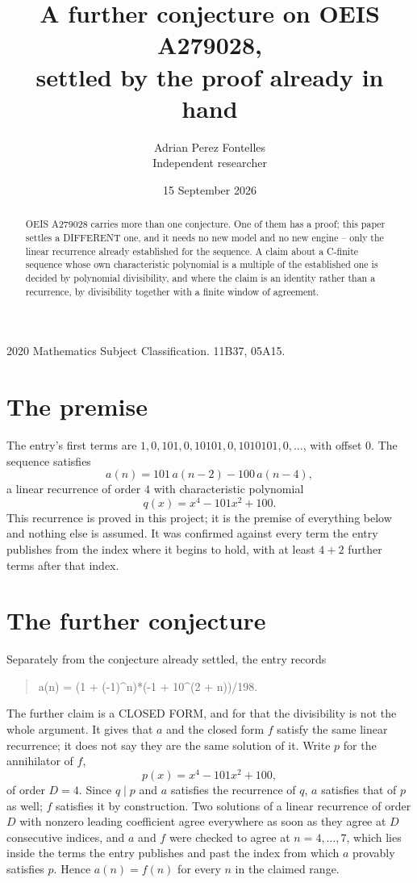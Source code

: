 \documentclass[11pt,a4paper]{article}
\title{A further conjecture on OEIS A279028,\\ \large settled by the proof already in hand}
\author{Adrian Perez Fontelles\\ \small Independent researcher}
\date{15 September 2026}
\theoremstyle{plain}
\theoremstyle{definition}
\begin{document}
\maketitle

\begin{abstract}
OEIS A279028 carries more than one conjecture. One of them has a proof; this paper settles a
DIFFERENT one, and it needs no new model and no new engine -- only the linear recurrence already
established for the sequence. A claim about a C-finite sequence whose own characteristic
polynomial is a multiple of the established one is decided by polynomial divisibility, and where
the claim is an identity rather than a recurrence, by divisibility together with a finite window
of agreement.
\end{abstract}

\noindent\small 2020 Mathematics Subject Classification. 11B37, 05A15.\normalsize

\section{The premise}

The entry's first terms are $1, 0, 101, 0, 10101, 0, 1010101, 0,\dots$, with offset $0$. The sequence satisfies
\[
  a(n)=101\,a(n-2) - 100\,a(n-4) ,
\]
a linear recurrence of order $4$ with characteristic polynomial
\[
  q(x)=x^{4} - 101 x^{2} + 100 .
\]
This recurrence is proved in this project; it is the premise of everything below and nothing else is assumed.
It was confirmed against every term the entry publishes from the index where it begins to hold,
with at least $4+2$ further terms after that index.

\section{The further conjecture}

Separately from the conjecture already settled, the entry records

\begin{quote}\raggedright a(n) = (1 + (-1)\^{}n)*(-1 + 10\^{}(2 + n))/198.\end{quote}

The further claim is a CLOSED FORM, and for that the divisibility is not the whole argument. It
gives that $a$ and the closed form $f$ satisfy the same linear recurrence; it does not say they
are the same solution of it. Write $p$ for the annihilator of $f$,
\[
  p(x)=x^{4} - 101 x^{2} + 100 ,
\]
of order $D=4$. Since $q\mid p$ and $a$ satisfies the recurrence of $q$, $a$ satisfies that of
$p$ as well; $f$ satisfies it by construction. Two solutions of a linear recurrence of order $D$
with nonzero leading coefficient agree everywhere as soon as they agree at $D$ consecutive
indices, and $a$ and $f$ were checked to agree at $n=4,\dots,7$,
which lies inside the terms the entry publishes and past the index from which $a$ provably
satisfies $p$. Hence $a(n)=f(n)$ for every $n$ in the claimed range.
\end{document}
